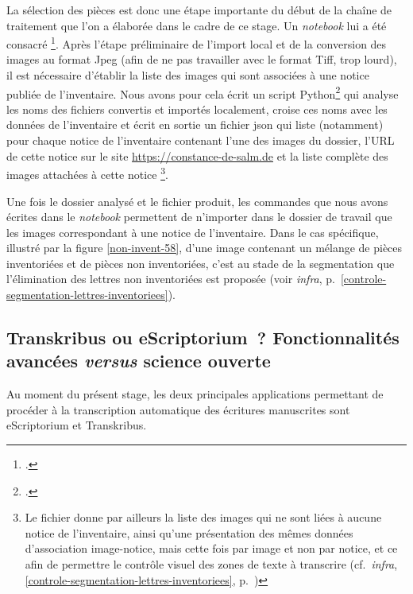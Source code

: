 \documentclass[a4paper,12pt,twoside]{book}
\begin{document}
				La sélection des pièces est donc une étape importante du début de la chaîne de traitement que l'on a élaborée dans le cadre de ce stage. Un \textit{notebook} lui a été consacré
				\footcite{biayPreparerTraitementDossier2022}.
				Après l'étape préliminaire de l'import local et de la conversion des images au format Jpeg (afin de ne pas travailler avec le format Tiff, trop lourd), il est nécessaire d'établir la liste des images qui sont associées à une notice publiée de l'inventaire. Nous avons pour cela écrit un script Python\footcite{biayDonneesImagesPy2022} qui analyse les noms des fichiers convertis et importés localement, croise ces noms avec les données de l'inventaire et écrit en sortie un fichier \gls{json} qui liste (notamment) pour chaque notice de l'inventaire contenant l'une des images du dossier, l'URL de cette notice sur le site \url{https://constance-de-salm.de} et la liste complète des images attachées à cette notice%
				\label{donnees-images}%
				\footnote{%
					Le fichier donne par ailleurs la liste des images qui ne sont liées à aucune notice de l'inventaire, ainsi qu'une présentation des mêmes données d'association image-notice, mais cette fois par image et non par notice, et ce afin de permettre le contrôle visuel des zones de texte à transcrire (cf.~\textit{infra}, \ref{controle-segmentation-lettres-inventoriees}, p.~\pageref{controle-segmentation-lettres-inventoriees})%
					}.
				
				Une fois le dossier analysé et le fichier produit, les commandes que nous avons écrites dans le \textit{notebook} permettent de n'importer dans le dossier de travail que les images correspondant à une notice de l'inventaire. Dans le cas spécifique, illustré par la figure \ref{non-invent-58}, d'une image contenant un mélange de pièces inventoriées et de pièces non inventoriées, c'est au stade de la \gls{segmentation} que l'élimination des lettres non inventoriées est proposée (voir \textit{infra}, p.~\ref{controle-segmentation-lettres-inventoriees}).
							
			\subsection[Transkribus ou eScriptorium~?]{Transkribus ou eScriptorium~? Fonctionnalités avancées \textit{versus} science ouverte}
				Au moment du présent stage, les deux principales applications permettant de procéder à la transcription automatique des écritures manuscrites sont eScriptorium et Transkribus.
				
\end{document}

